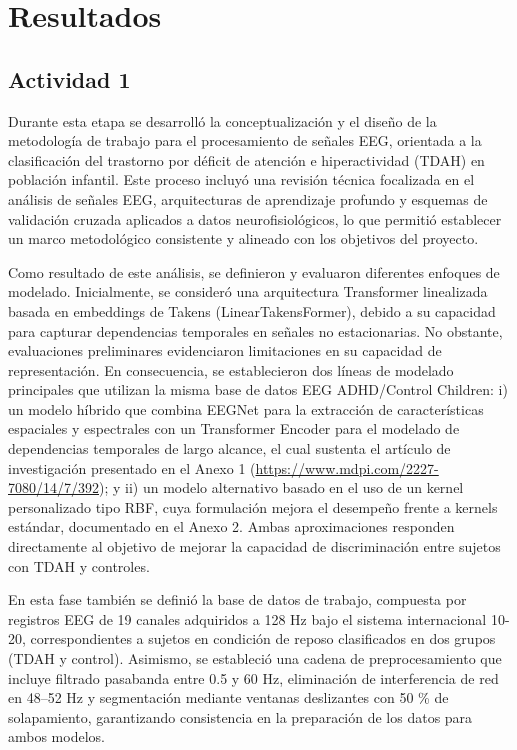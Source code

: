 \section{Resultados}

\subsection{Actividad 1}

Durante esta etapa se desarrolló la conceptualización y el diseño de la metodología de trabajo para el procesamiento de señales EEG, orientada a la clasificación del trastorno por déficit de atención e hiperactividad (TDAH) en población infantil. Este proceso incluyó una revisión técnica focalizada en el análisis de señales EEG, arquitecturas de aprendizaje profundo y esquemas de validación cruzada aplicados a datos neurofisiológicos, lo que permitió establecer un marco metodológico consistente y alineado con los objetivos del proyecto.

Como resultado de este análisis, se definieron y evaluaron diferentes enfoques de modelado. Inicialmente, se consideró una arquitectura Transformer linealizada basada en embeddings de Takens (LinearTakensFormer), debido a su capacidad para capturar dependencias temporales en señales no estacionarias. No obstante, evaluaciones preliminares evidenciaron limitaciones en su capacidad de representación. En consecuencia, se establecieron dos líneas de modelado principales que utilizan la misma base de datos EEG ADHD/Control Children: i) un modelo híbrido que combina EEGNet para la extracción de características espaciales y espectrales con un Transformer Encoder para el modelado de dependencias temporales de largo alcance, el cual sustenta el artículo de investigación presentado en el Anexo 1 (\url{https://www.mdpi.com/2227-7080/14/7/392}); y ii) un modelo alternativo basado en el uso de un kernel personalizado tipo RBF, cuya formulación mejora el desempeño frente a kernels estándar, documentado en el Anexo 2. Ambas aproximaciones responden directamente al objetivo de mejorar la capacidad de discriminación entre sujetos con TDAH y controles.

En esta fase también se definió la base de datos de trabajo, compuesta por registros EEG de 19 canales adquiridos a 128 Hz bajo el sistema internacional 10-20, correspondientes a sujetos en condición de reposo clasificados en dos grupos (TDAH y control). Asimismo, se estableció una cadena de preprocesamiento que incluye filtrado pasabanda entre 0.5 y 60 Hz, eliminación de interferencia de red en 48–52 Hz y segmentación mediante ventanas deslizantes con 50 \% de solapamiento, garantizando consistencia en la preparación de los datos para ambos modelos.

